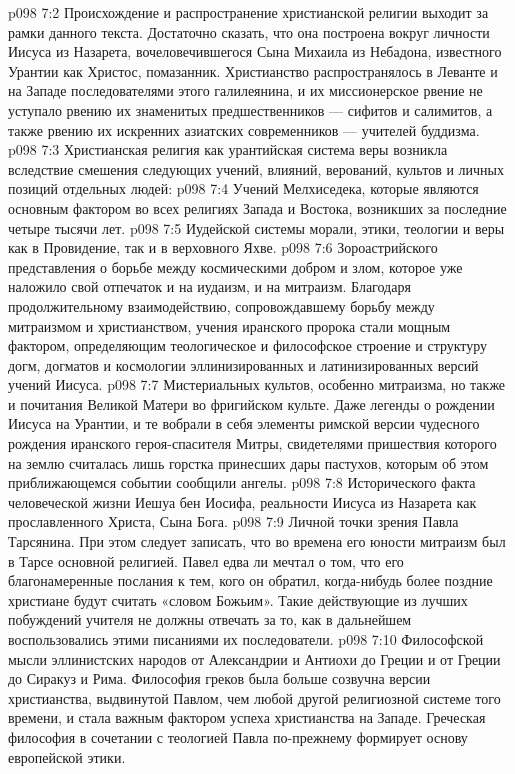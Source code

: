 \vs p098 7:2 Происхождение и распространение христианской религии выходит за рамки данного текста. Достаточно сказать, что она построена вокруг личности Иисуса из Назарета, вочеловечившегося Сына Михаила из Небадона, известного Урантии как Христос, помазанник. Христианство распространялось в Леванте и на Западе последователями этого галилеянина, и их миссионерское рвение не уступало рвению их знаменитых предшественников --- сифитов и салимитов, а также рвению их искренних азиатских современников --- учителей буддизма.
\vs p098 7:3 Христианская религия как урантийская система веры возникла вследствие смешения следующих учений, влияний, верований, культов и личных позиций отдельных людей:
\vs p098 7:4 \bibnobreakspace Учений Мелхиседека, которые являются основным фактором во всех религиях Запада и Востока, возникших за последние четыре тысячи лет.
\vs p098 7:5 \bibnobreakspace Иудейской системы морали, этики, теологии и веры как в Провидение, так и в верховного Яхве.
\vs p098 7:6 \bibnobreakspace Зороастрийского представления о борьбе между космическими добром и злом, которое уже наложило свой отпечаток и на иудаизм, и на митраизм. Благодаря продолжительному взаимодействию, сопровождавшему борьбу между митраизмом и христианством, учения иранского пророка стали мощным фактором, определяющим теологическое и философское строение и структуру догм, догматов и космологии эллинизированных и латинизированных версий учений Иисуса.
\vs p098 7:7 \bibnobreakspace Мистериальных культов, особенно митраизма, но также и почитания Великой Матери во фригийском культе. Даже легенды о рождении Иисуса на Урантии, и те вобрали в себя элементы римской версии чудесного рождения иранского героя\hyp{}спасителя Митры, свидетелями пришествия которого на землю считалась лишь горстка принесших дары пастухов, которым об этом приближающемся событии сообщили ангелы.
\vs p098 7:8 \bibnobreakspace Исторического факта человеческой жизни Иешуа бен Иосифа, реальности Иисуса из Назарета как прославленного Христа, Сына Бога.
\vs p098 7:9 \bibnobreakspace Личной точки зрения Павла Тарсянина. При этом следует записать, что во времена его юности митраизм был в Тарсе основной религией. Павел едва ли мечтал о том, что его благонамеренные послания к тем, кого он обратил, когда\hyp{}нибудь более поздние христиане будут считать «словом Божьим». Такие действующие из лучших побуждений учителя не должны отвечать за то, как в дальнейшем воспользовались этими писаниями их последователи.
\vs p098 7:10 \bibnobreakspace Философской мысли эллинистских народов от Александрии и Антиохи до Греции и от Греции до Сиракуз и Рима. Философия греков была больше созвучна версии христианства, выдвинутой Павлом, чем любой другой религиозной системе того времени, и стала важным фактором успеха христианства на Западе. Греческая философия в сочетании с теологией Павла по\hyp{}прежнему формирует основу европейской этики.
